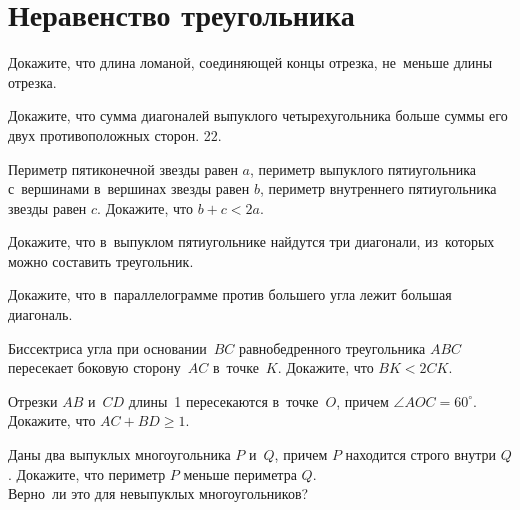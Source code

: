 
\section*{Неравенство треугольника}


\begin{problems}

\item
Докажите, что длина ломаной, соединяющей концы отрезка, не~меньше длины отрезка.

\item
Докажите, что сумма диагоналей выпуклого четырехугольника больше суммы его двух
противоположных сторон.
2$2$.

\item
Периметр пятиконечной звезды равен $a$, периметр выпуклого пятиугольника
с~вершинами в~вершинах звезды равен $b$, периметр внутреннего пятиугольника
звезды равен $c$.
Докажите, что $b + c < 2 a$.

\item
Докажите, что в~выпуклом пятиугольнике найдутся три диагонали, из~которых можно
составить треугольник.

\item
Докажите, что в~параллелограмме против большего угла лежит большая диагональ.

\item
Биссектриса угла при основании~$BC$ равнобедренного треугольника $ABC$
пересекает боковую сторону~$AC$ в~точке~$K$.
Докажите, что $BK < 2 CK$.

\item
Отрезки $AB$ и~$CD$ длины~1 пересекаются в~точке~$O$, причем
$\angle AOC = 60^\circ$.
Докажите, что $AC + BD \geq 1$.

\item
\subproblem
Даны два выпуклых многоугольника $P$ и~$Q$, причем $P$ находится строго
внутри $Q$.
Докажите, что периметр $P$ меньше периметра $Q$.
\\
\subproblem
Верно~ли это для невыпуклых многоугольников?

\end{problems}

